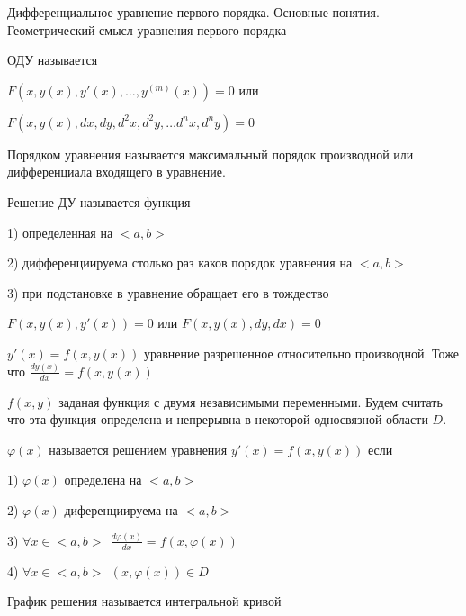 \begin{title}[\Large]
  Дифференциальное уравнение первого порядка. Основные понятия. Геометрический
  смысл уравнения первого порядка
\end{title}

\begin{define}
  ОДУ называется

  $F(x, y(x), y'(x), \ldots, y^{(m)} (x)) = 0$ или

  $F(x, y(x), dx, dy, d^2 x, d^2 y, \ldots d^n x, d^n y) = 0$
\end{define}

\begin{define}
  Порядком уравнения называется максимальный порядок производной или
  дифференциала входящего в уравнение.
\end{define}

\begin{define}[решения ДУ]
  Решение ДУ называется функция

  1) определенная на $<a,b>$

  2) дифференциируема столько раз каков порядок уравнения на $<a,b>$

  3) при подстановке в уравнение обращает его в тождество
\end{define}

\begin{block}[ДУ 1 порядка]
  $F(x, y(x), y'(x)) = 0$ или $F(x, y(x), dy, dx) = 0$

  $y'(x) = f(x, y(x))$ уравнение разрешенное относительно производной. Тоже
  что $\frac{dy(x)}{dx} = f(x, y(x))$

  $f(x, y)$ заданая функция с двумя независимыми переменными. Будем считать
  что эта функция определена и непрерывна в некоторой односвязной области $D$.
\end{block}

\begin{define}
  $\varphi (x)$ называется решением уравнения $y'(x) = f(x, y(x))$ если

  1) $\varphi (x)$ определена на $<a,b>$

  2) $\varphi (x)$ диференциируема на $<a,b>$

  3) $\forall x \in <a,b> ~~ \frac{d\varphi (x)}{dx} = f(x, \varphi(x))$

  4) $\forall x \in <a,b> ~~ (x, \varphi(x)) \in D$

  График решения называется интегральной кривой
\end{define}

